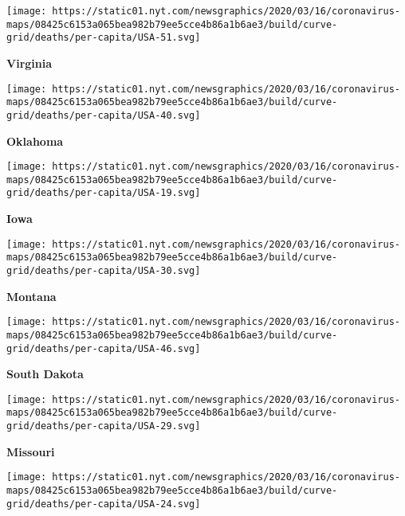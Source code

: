 \href{https://www.nytimes.com/interactive/2020/us/virginia-coronavirus-cases.html}{}

\texttt{[image: https://static01.nyt.com/newsgraphics/2020/03/16/coronavirus-maps/08425c6153a065bea982b79ee5cce4b86a1b6ae3/build/curve-grid/deaths/per-capita/USA-51.svg]}

\textbf{Virginia}

\href{https://www.nytimes.com/interactive/2020/us/oklahoma-coronavirus-cases.html}{}

\texttt{[image: https://static01.nyt.com/newsgraphics/2020/03/16/coronavirus-maps/08425c6153a065bea982b79ee5cce4b86a1b6ae3/build/curve-grid/deaths/per-capita/USA-40.svg]}

\textbf{Oklahoma}

\href{https://www.nytimes.com/interactive/2020/us/iowa-coronavirus-cases.html}{}

\texttt{[image: https://static01.nyt.com/newsgraphics/2020/03/16/coronavirus-maps/08425c6153a065bea982b79ee5cce4b86a1b6ae3/build/curve-grid/deaths/per-capita/USA-19.svg]}

\textbf{Iowa}

\href{https://www.nytimes.com/interactive/2020/us/montana-coronavirus-cases.html}{}

\texttt{[image: https://static01.nyt.com/newsgraphics/2020/03/16/coronavirus-maps/08425c6153a065bea982b79ee5cce4b86a1b6ae3/build/curve-grid/deaths/per-capita/USA-30.svg]}

\textbf{Montana}

\href{https://www.nytimes.com/interactive/2020/us/south-dakota-coronavirus-cases.html}{}

\texttt{[image: https://static01.nyt.com/newsgraphics/2020/03/16/coronavirus-maps/08425c6153a065bea982b79ee5cce4b86a1b6ae3/build/curve-grid/deaths/per-capita/USA-46.svg]}

\textbf{South Dakota}

\href{https://www.nytimes.com/interactive/2020/us/missouri-coronavirus-cases.html}{}

\texttt{[image: https://static01.nyt.com/newsgraphics/2020/03/16/coronavirus-maps/08425c6153a065bea982b79ee5cce4b86a1b6ae3/build/curve-grid/deaths/per-capita/USA-29.svg]}

\textbf{Missouri}

\href{https://www.nytimes.com/interactive/2020/us/maryland-coronavirus-cases.html}{}

\texttt{[image: https://static01.nyt.com/newsgraphics/2020/03/16/coronavirus-maps/08425c6153a065bea982b79ee5cce4b86a1b6ae3/build/curve-grid/deaths/per-capita/USA-24.svg]}

